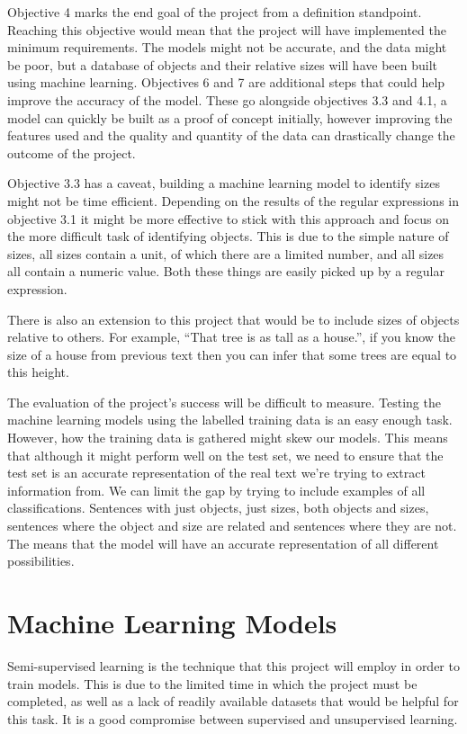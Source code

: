 \documentclass[11pt,oneside]{book}
\begin{document}
Objective 4 marks the end goal of the project from a definition standpoint. Reaching this objective would mean that the project will have implemented the minimum requirements. The models might not be accurate, and the data might be poor, but a database of objects and their relative sizes will have been built using machine learning. Objectives 6 and 7 are additional steps that could help improve the accuracy of the model. These go alongside objectives 3.3 and 4.1, a model can quickly be built as a proof of concept initially, however improving the features used and the quality and quantity of the data can drastically change the outcome of the project.

Objective 3.3 has a caveat, building a machine learning model to identify sizes might not be time efficient. Depending on the results of the regular expressions in objective 3.1 it might be more effective to stick with this approach and focus on the more difficult task of identifying objects. This is due to the simple nature of sizes, all sizes contain a unit, of which there are a limited number, and all sizes all contain a numeric value. Both these things are easily picked up by a regular expression.

There is also an extension to this project that would be to include sizes of objects relative to others. For example, “That tree is as tall as a house.”, if you know the size of a house from previous text then you can infer that some trees are equal to this height.

The evaluation of the project’s success will be difficult to measure. Testing the machine learning models using the labelled training data is an easy enough task. However, how the training data is gathered might skew our models. This means that although it might perform well on the test set, we need to ensure that the test set is an accurate representation of the real text we’re trying to extract information from. We can limit the gap by trying to include examples of all classifications. Sentences with just objects, just sizes, both objects and sizes, sentences where the object and size are related and sentences where they are not. The means that the model will have an accurate representation of all different possibilities.

\section{Machine Learning Models}

Semi-supervised learning is the technique that this project will employ in order to train models. This is due to the limited time in which the project must be completed, as well as a lack of readily available datasets that would be helpful for this task. It is a good compromise between supervised and unsupervised learning.
\end{document}

